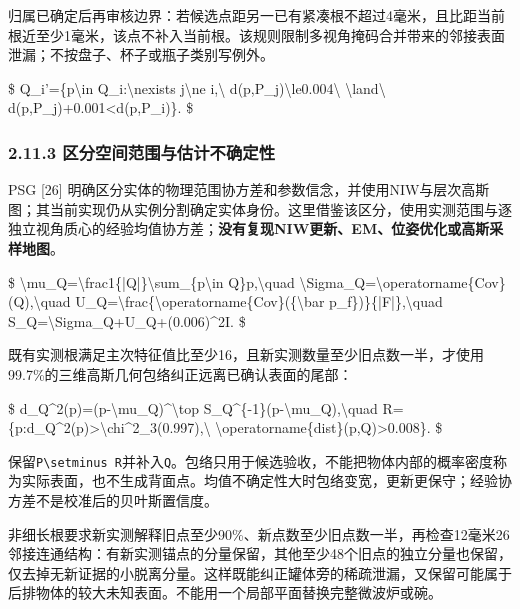 \documentclass[UTF8,fontset=fandol]{ctexart}
\begin{document}
归属已确定后再审核边界：若候选点距另一已有紧凑根不超过4毫米，且比距当前根近至少1毫米，该点不补入当前根。该规则限制多视角掩码合并带来的邻接表面泄漏；不按盘子、杯子或瓶子类别写例外。



\$
Q\_i'=\{p\textbackslash{}in Q\_i:\textbackslash{}nexists j\textbackslash{}ne i,\textbackslash{} d(p,P\_j)\textbackslash{}le0.004\textbackslash{} \textbackslash{}land\textbackslash{} d(p,P\_j)+0.001<d(p,P\_i)\}.
\$



\subsubsection*{2.11.3 区分空间范围与估计不确定性}

PSG [26] 明确区分实体的物理范围协方差和参数信念，并使用NIW与层次高斯图；其当前实现仍从实例分割确定实体身份。这里借鉴该区分，使用实测范围与逐独立视角质心的经验均值协方差；\textbf{没有复现NIW更新、EM、位姿优化或高斯采样地图}。



\$
\textbackslash{}mu\_Q=\textbackslash{}frac1\{|Q|\}\textbackslash{}sum\_\{p\textbackslash{}in Q\}p,\textbackslash{}quad \textbackslash{}Sigma\_Q=\textbackslash{}operatorname\{Cov\}(Q),\textbackslash{}quad U\_Q=\textbackslash{}frac\{\textbackslash{}operatorname\{Cov\}(\{\textbackslash{}bar p\_f\})\}\{|F|\},\textbackslash{}quad S\_Q=\textbackslash{}Sigma\_Q+U\_Q+(0.006)\textasciicircum{}2I.
\$



既有实测根满足主次特征值比至少16，且新实测数量至少旧点数一半，才使用99.7\%的三维高斯几何包络纠正远离已确认表面的尾部：



\$
d\_Q\textasciicircum{}2(p)=(p-\textbackslash{}mu\_Q)\textasciicircum{}\textbackslash{}top S\_Q\textasciicircum{}\{-1\}(p-\textbackslash{}mu\_Q),\textbackslash{}quad R=\{p:d\_Q\textasciicircum{}2(p)>\textbackslash{}chi\textasciicircum{}2\_3(0.997),\textbackslash{} \textbackslash{}operatorname\{dist\}(p,Q)>0.008\}.
\$



保留\texttt{P\textbackslash{}setminus R}并补入\texttt{Q}。包络只用于候选验收，不能把物体内部的概率密度称为实际表面，也不生成背面点。均值不确定性大时包络变宽，更新更保守；经验协方差不是校准后的贝叶斯置信度。



非细长根要求新实测解释旧点至少90\%、新点数至少旧点数一半，再检查12毫米26邻接连通结构：有新实测锚点的分量保留，其他至少48个旧点的独立分量也保留，仅去掉无新证据的小脱离分量。这样既能纠正罐体旁的稀疏泄漏，又保留可能属于后排物体的较大未知表面。不能用一个局部平面替换完整微波炉或碗。
\end{document}

